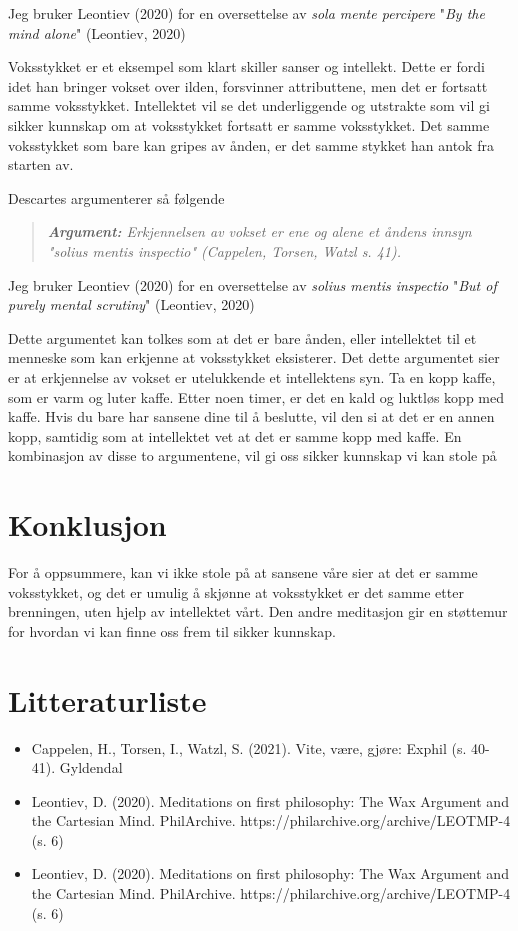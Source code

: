\documentclass[11pt, a4paper]{article}
\newenvironment{argument}{\begin{quote}\itshape\textbf{Argument: }}{\end{quote}}
\begin{document}
Jeg bruker Leontiev (2020) for en oversettelse av \textit{sola mente percipere} "\textit{By the mind alone}" (Leontiev, 2020)


Voksstykket er et eksempel som klart skiller sanser og intellekt. Dette er fordi idet han bringer vokset over ilden, forsvinner attributtene, men det er fortsatt samme voksstykket. Intellektet vil se det underliggende og utstrakte som vil gi sikker kunnskap om at voksstykket fortsatt er samme voksstykket. Det samme voksstykket som bare kan gripes av ånden, er det samme stykket han antok fra starten av.

Descartes argumenterer så følgende

\begin{argument}
    Erkjennelsen av vokset er ene og alene et åndens innsyn "\textit{solius mentis inspectio}" (Cappelen, Torsen, Watzl s. 41). 
\end{argument}


Jeg bruker Leontiev (2020) for en oversettelse av \textit{solius mentis inspectio} "\textit{But of purely mental scrutiny}" (Leontiev, 2020)

Dette argumentet kan tolkes som at det er bare ånden, eller intellektet til et menneske som kan erkjenne at voksstykket eksisterer. Det dette argumentet sier er at erkjennelse av vokset er utelukkende et intellektens syn. Ta en kopp kaffe, som er varm og luter kaffe. Etter noen timer, er det en kald og luktløs kopp med kaffe. Hvis du bare har sansene dine til å beslutte, vil den si at det er en annen kopp, samtidig som at intellektet vet at det er samme kopp med kaffe. En kombinasjon av disse to argumentene, vil gi oss sikker kunnskap vi kan stole på

\section{Konklusjon}

For å oppsummere, kan vi ikke stole på at sansene våre sier at det er samme voksstykket, og det er umulig å skjønne at voksstykket er det samme etter brenningen, uten hjelp av intellektet vårt. Den andre meditasjon gir en støttemur for hvordan vi kan finne oss frem til sikker kunnskap. 




\section{Litteraturliste}

\begin{itemize}
    \item Cappelen, H., Torsen, I., Watzl, S. (2021). Vite, være, gjøre: Exphil (s. 40-41). Gyldendal
    \item Leontiev, D. (2020). Meditations on first philosophy: The Wax Argument and the Cartesian Mind. PhilArchive. https://philarchive.org/archive/LEOTMP-4 (s. 6)
    \item Leontiev, D. (2020). Meditations on first philosophy: The Wax Argument and the Cartesian Mind. PhilArchive. https://philarchive.org/archive/LEOTMP-4 (s. 6)
\end{itemize}
\end{document}

